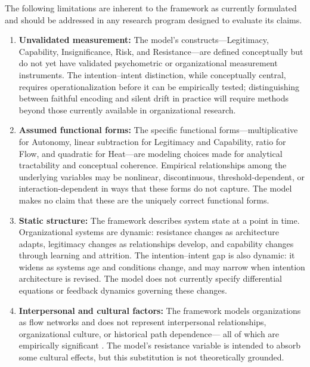 \documentclass[12pt]{article}
\begin{document}
The following limitations are inherent to the framework as currently formulated
and should be addressed in any research program designed to evaluate its claims.

\begin{enumerate}
  \item \textbf{Unvalidated measurement:} The model's constructs---Legitimacy,
    Capability, Insignificance, Risk, and Resistance---are defined
    conceptually but do not yet have validated psychometric or organizational
    measurement instruments. The intention--intent distinction, while
    conceptually central, requires operationalization before it can be
    empirically tested; distinguishing between faithful encoding and silent
    drift in practice will require methods beyond those currently available
    in organizational research.

  \item \textbf{Assumed functional forms:} The specific functional
    forms---multiplicative for Autonomy, linear subtraction for Legitimacy
    and Capability, ratio for Flow, and quadratic for Heat---are modeling
    choices made for analytical tractability and conceptual coherence.
    Empirical relationships among the underlying variables may be nonlinear,
    discontinuous, threshold-dependent, or interaction-dependent in ways
    that these forms do not capture. The model makes no claim that these
    are the uniquely correct functional forms.

  \item \textbf{Static structure:} The framework describes system state
    at a point in time. Organizational systems are dynamic: resistance
    changes as architecture adapts, legitimacy changes as relationships
    develop, and capability changes through learning and attrition. The
    intention--intent gap is also dynamic: it widens as systems age and
    conditions change, and may narrow when intention architecture is
    revised. The model does not currently specify differential equations or
    feedback dynamics governing these changes.

  \item \textbf{Interpersonal and cultural factors:} The framework models
    organizations as flow networks and does not represent interpersonal
    relationships, organizational culture, or historical path dependence---
    all of which are empirically significant \citep{schein1985organizational}.
    The model's resistance variable is intended to absorb some cultural
    effects, but this substitution is not theoretically grounded.


\end{enumerate}
\end{document}
